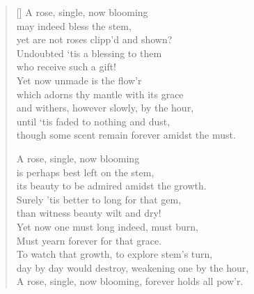 \begin{verse}[\textwidth]
  A rose, single, now blooming\\
  \vin may indeed bless the stem,\\
  yet are not roses clipp’d and shown?\\
  \vin Undoubted ‘tis a blessing to them\\
  who receive such a gift!\\
  \vin Yet now unmade is the flow’r\\
  which adorns thy mantle with its grace\\
  \vin and withers, however slowly, by the hour,\\
  \vin \vin until ‘tis faded to nothing and dust,\\
  \vin \vin though some scent remain forever amidst the must.

  A rose, single, now blooming\\
  \vin is perhaps best left on the stem,\\
  its beauty to be admired amidst the growth.\\
  \vin Surely 'tis better to long for that gem,\\
  than witness beauty wilt and dry!\\
  \vin Yet now one must long indeed, must burn,\\
  Must yearn forever for that grace.\\
  \vin To watch that growth, to explore stem's turn,\\
  \vin \vin day by day would destroy, weakening one by the hour,\\
  \vin \vin A rose, single, now blooming, forever holds all pow'r.
\end{verse}
